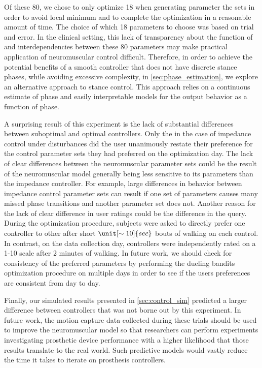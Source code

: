 Of these 80, we chose to only optimize 18 when generating parameter the sets in
order to avoid local minimum and to complete the optimization in a reasonable
amount of time. The choice of which 18 parameters to choose was based on trial
and error. In the clinical setting, this lack of transparency about the function
of and interdependencies between these 80 parameters may make practical
application of neuromuscular control difficult.  Therefore, in order to achieve
the potential benefits of a smooth controller that does not have discrete stance
phases, while avoiding excessive complexity, in \cref{sec:phase_estimation}, we
explore an alternative approach to stance control. This approach relies on a
continuous estimate of phase and easily interpretable models for the output
behavior as a function of phase.

A surprising result of this experiment is the lack of substantial differences
between suboptimal and optimal controllers. Only the in the case of impedance
control under disturbances did the user unanimously restate their preference for
the control parameter sets they had preferred on the optimization day. The lack
of clear differences between the neuromuscular parameter sets could be the
result of the neuromuscular model generally being less sensitive to its
parameters than the impedance controller. For example, large differences in
behavior between impedance control parameter sets can result if one set of
parameters causes many missed phase transitions and another parameter set does
not. Another reason for the lack of clear difference in user ratings could be
the difference in the query. During the optimization procedure, subjects were
asked to directly prefer one controller to other after short
$\unit[\sim10]{sec}$ bouts of walking on each control. In contrast, on the data
collection day, controllers were independently rated on a 1-10 scale after 2
minutes of walking. In future work, we should check for consistency of the
preferred parameters by performing the dueling bandits optimization procedure on
multiple days in order to see if the users preferences are consistent from day
to day.

Finally, our simulated results presented in \cref{sec:control_sim} predicted a
larger difference between controllers that was not borne out by this experiment.
In future work, the motion capture data collected during these trials should be
used to improve the neuromuscular model so that researchers can perform
experiments investigating prosthetic device performance with a higher likelihood
that those results translate to the real world. Such predictive models would
vastly reduce the time it takes to iterate on prosthesis controllers.
